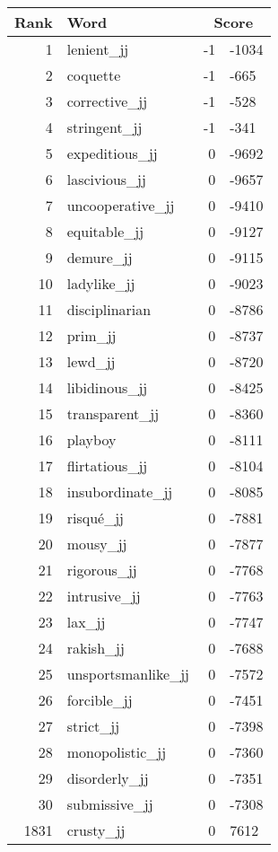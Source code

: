 \begin{longtable}[!htbp]{| rlr@{.}l |}
    \hline
    \textbf{Rank} & \textbf{Word} & \multicolumn{2}{c|}{\textbf{Score}} \\
    \hline
    \endhead
    1 & lenient\_jj & -1 & -1034 \\
    2 & coquette & -1 & -665 \\
    3 & corrective\_jj & -1 & -528 \\
    4 & stringent\_jj & -1 & -341 \\
    5 & expeditious\_jj & 0 & -9692 \\
    6 & lascivious\_jj & 0 & -9657 \\
    7 & uncooperative\_jj & 0 & -9410 \\
    8 & equitable\_jj & 0 & -9127 \\
    9 & demure\_jj & 0 & -9115 \\
    10 & ladylike\_jj & 0 & -9023 \\
    11 & disciplinarian & 0 & -8786 \\
    12 & prim\_jj & 0 & -8737 \\
    13 & lewd\_jj & 0 & -8720 \\
    14 & libidinous\_jj & 0 & -8425 \\
    15 & transparent\_jj & 0 & -8360 \\
    16 & playboy & 0 & -8111 \\
    17 & flirtatious\_jj & 0 & -8104 \\
    18 & insubordinate\_jj & 0 & -8085 \\
    19 & risqué\_jj & 0 & -7881 \\
    20 & mousy\_jj & 0 & -7877 \\
    21 & rigorous\_jj & 0 & -7768 \\
    22 & intrusive\_jj & 0 & -7763 \\
    23 & lax\_jj & 0 & -7747 \\
    24 & rakish\_jj & 0 & -7688 \\
    25 & unsportsmanlike\_jj & 0 & -7572 \\
    26 & forcible\_jj & 0 & -7451 \\
    27 & strict\_jj & 0 & -7398 \\
    28 & monopolistic\_jj & 0 & -7360 \\
    29 & disorderly\_jj & 0 & -7351 \\
    30 & submissive\_jj & 0 & -7308 \\
    1831 & crusty\_jj & 0 & 7612 \\

\end{longtable}
